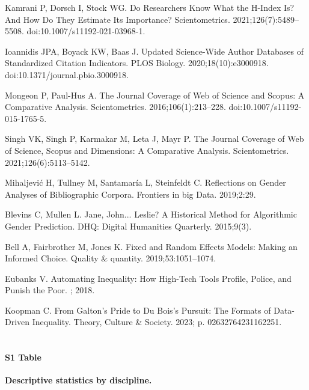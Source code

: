 \documentclass[
  10pt,
  letterpaper,
]{article}
\providecommand{\DIFaddtex}[1]{{\protect\color{blue}\uwave{#1}}} %
\providecommand{\DIFaddbegin}{} %
\providecommand{\DIFaddend}{} %
\providecommand{\DIFdelbegin}{} %
\providecommand{\DIFdelend}{} %
\providecommand{\DIFadd}[1]{\texorpdfstring{\DIFaddtex{#1}}{#1}} %
\newcommand{\DIFscaledelfig}{0.5}
\newlength{\DIFdelgraphicswidth} %
\newlength{\DIFdelgraphicsheight} %
\newcommand{\DIFaddincludegraphics}[2][]{{\color{blue}\fbox{\DIFOincludegraphics[#1]{#2}}}} %
\newcommand{\DIFdelincludegraphics}[2][]{%
\sbox{\DIFdelgraphicsbox}{\DIFOincludegraphics[#1]{#2}}%
\settoboxwidth{\DIFdelgraphicswidth}{\DIFdelgraphicsbox} %
\settoboxtotalheight{\DIFdelgraphicsheight}{\DIFdelgraphicsbox} %
\scalebox{\DIFscaledelfig}{%
\parbox[b]{\DIFdelgraphicswidth}{\usebox{\DIFdelgraphicsbox}\\[-\baselineskip] \rule{\DIFdelgraphicswidth}{0em}}\llap{\resizebox{\DIFdelgraphicswidth}{\DIFdelgraphicsheight}{%
\setlength{\unitlength}{\DIFdelgraphicswidth}%
\begin{picture}(1,1)%
\thicklines\linethickness{2pt} %
{\color[rgb]{1,0,0}\put(0,0){\framebox(1,1){}}}%
{\color[rgb]{1,0,0}\put(0,0){\line( 1,1){1}}}%
{\color[rgb]{1,0,0}\put(0,1){\line(1,-1){1}}}%
\end{picture}%
}\hspace*{3pt}}} %
} %
\DeclareRobustCommand{\DIFaddbegin}{\DIFOaddbegin \let\includegraphics\DIFaddincludegraphics} %
\DeclareRobustCommand{\DIFaddend}{\DIFOaddend \let\includegraphics\DIFOincludegraphics} %
\DeclareRobustCommand{\DIFdelbegin}{\DIFOdelbegin \let\includegraphics\DIFdelincludegraphics} %
\DeclareRobustCommand{\DIFdelend}{\DIFOaddend \let\includegraphics\DIFOincludegraphics} %
\begin{document}
\begin{thebibliography}{10}
Kamrani P, Dorsch I, Stock WG.
\newblock Do Researchers Know What the H-Index Is? {{And}} How Do They Estimate Its Importance?
\newblock Scientometrics. 2021;126(7):5489--5508.
\newblock doi:{10.1007/s11192-021-03968-1}.

Ioannidis JPA, Boyack KW, Baas J.
\newblock Updated Science-Wide Author Databases of Standardized Citation Indicators.
\newblock PLOS Biology. 2020;18(10):e3000918.
\newblock doi:{10.1371/journal.pbio.3000918}.

Mongeon P, {Paul-Hus} A.
\newblock The Journal Coverage of {{Web}} of {{Science}} and {{Scopus}}: A Comparative Analysis.
\newblock Scientometrics. 2016;106(1):213--228.
\newblock doi:{10.1007/s11192-015-1765-5}.

Singh VK, Singh P, Karmakar M, Leta J, Mayr P.
\newblock The Journal Coverage of {{Web}} of {{Science}}, {{Scopus}} and {{Dimensions}}: {{A}} Comparative Analysis.
\newblock Scientometrics. 2021;126(6):5113--5142.

Mihaljevi{\'c} H, Tullney M, Santamar{\'i}a L, Steinfeldt C.
\newblock Reflections on Gender Analyses of Bibliographic Corpora.
\newblock Frontiers in big Data. 2019;2:29.

Blevins C, Mullen L.
\newblock Jane, {{John}}... {{Leslie}}? {{A Historical Method}} for {{Algorithmic Gender Prediction}}.
\newblock DHQ: Digital Humanities Quarterly. 2015;9(3).

Bell A, Fairbrother M, Jones K.
\newblock Fixed and Random Effects Models: Making an Informed Choice.
\newblock Quality \& quantity. 2019;53:1051--1074.

Eubanks V.
\newblock Automating Inequality: {{How}} High-Tech Tools Profile, Police, and Punish the Poor.
; 2018.

Koopman C.
\newblock From {{Galton}}'s {{Pride}} to {{Du Bois}}'s {{Pursuit}}: {{The Formats}} of {{Data-Driven Inequality}}.
\newblock Theory, Culture \& Society. 2023; p. 02632764231162251.

\end{thebibliography}


\DIFdelbegin %
\DIFdelend \DIFaddbegin \section{\DIFadd{Supporting Information}}\label{supporting-information}
\DIFaddend 

\paragraph*{S1 Table}
\label{id}
{\textbf{Descriptive statistics by discipline.}}


\nolinenumbers
\end{document}
